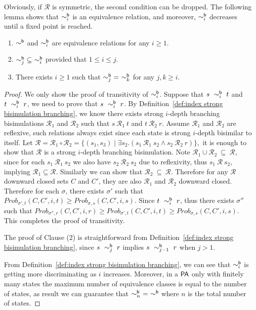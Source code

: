 \documentclass{LMCS}
\newcommand{\PA}{{\sf PA}}
\newcommand{\iBSB}[1]{\sim_{#1}^{{\sf b}}}
\newcommand{\MC}[1]{\mathcal{#1}}
\newcommand{\MEASURE}{\mathit{Prob}}
\begin{document}
Obviously, if $\MC{R}$ is symmetric, the second condition can be dropped.
The following lemma shows that $\iBSB{i}$ is an equivalence relation, and moreover,  $\iBSB{i}$ decreases until a fixed point is reached.
\begin{lem}\label{lem:i equivalence relation branching}\hfill
\begin{enumerate}[\em(1)]
\item $\iBSB{}$ and $\iBSB{i}$ are  equivalence relations for any $i\ge 1$.
\item $\iBSB{j}~\subseteq~\iBSB{i}$ provided that $1\leq i \leq j$.
\item There exists $i\geq 1$ such that $\iBSB{j}~=~\iBSB{k}$ for any $j,k\geq i$.
\end{enumerate}
\end{lem}
\begin{proof}
  We only show the proof of transitivity of $\iBSB{i}$. Suppose that
  $s~\iBSB{i}~t$ and $t~\iBSB{i}~r$, we need to prove that
  $s~\iBSB{i}~r$. By Definition~\ref{def:index strong bisimulation
    branching}, we know there exists strong $i$-depth branching
  bisimulations $\MC{R}_1$ and $\MC{R}_2$ such that $s~\MC{R}_1~t$ and
  $t~\MC{R}_2~r$. Assume $\MC{R}_1$ and $\MC{R}_2$ are reflexive, such
  relations always exist since each state is strong $i$-depth bisimilar to
  itself.
  Let $\MC{R}=\MC{R}_1\circ\MC{R}_2=\{(s_1,s_3)\mid\exists
  s_2.(s_1~\MC{R}_1~s_2\land s_2~\MC{R}_2~r)\},$ it is enough to show
  that $\MC{R}$ is a strong $i$-depth branching bisimulation. Note
  $\MC{R}_1\cup\MC{R}_2~\subseteq~\MC{R}$, since for each
  $s_1~\MC{R}_1~s_2$ we also have $s_2~\MC{R}_2~s_2$ due to
  reflexivity, thus $s_1~\MC{R}~s_2$, implying $\MC{R}_1\subseteq\MC{R}$.
  Similarly we can show that
  $\MC{R}_2~\subseteq~\MC{R}$. Therefore for any $\MC{R}$ downward
  closed sets $C$ and $C'$, they are also $\MC{R}_1$ and $\MC{R}_2$
  downward closed. Therefore for each $\sigma$, 
  there exists $\sigma'$ such that
  $\MEASURE_{\sigma',t}(C,C',i,t)\geq\MEASURE_{\sigma,s}(C,C',i,s)$. Since
  $t~\iBSB{i}~r$, thus there exists $\sigma''$ such that
  $\MEASURE_{\sigma'',r}(C,C',i,r)\geq\MEASURE_{\sigma',t}(C,C',i,t)\geq\MEASURE_{\sigma,s}(C,C',i,s)$. This
  completes the proof of transitivity.


The proof of Clause (2) is straightforward from Definition~\ref{def:index strong bisimulation branching}, since $s~\iBSB{j}~r$ implies $s~\iBSB{j-1}~r$ when $j>1$.

From Definition~\ref{def:index strong bisimulation branching}, we can see that $\iBSB{i}$ is getting more discriminating as $i$ increases.
Moreover, in a $\PA$ only with finitely many states the maximum number of equivalence classes is equal to the number of states, as result we can guarantee that $\iBSB{n}~=~\iBSB{}$ where $n$ is the total number of states.
\end{proof}
\end{document}
